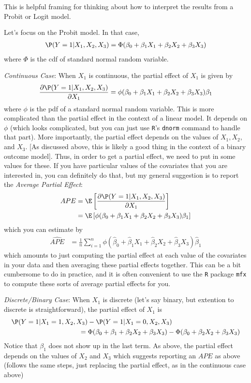 \documentclass[
  letterpaper,
  DIV=11,
  numbers=noendperiod]{scrreprt}
\begin{document}
This is helpful framing for thinking about how to interpret the results
from a Probit or Logit model.

Let's focus on the Probit model. In that case, \begin{align*}
  \P(Y=1|X_1,X_2,X_3) = \Phi(\beta_0 + \beta_1 X_1 + \beta_2 X_2 + \beta_3 X_3)
\end{align*} where \(\Phi\) is the cdf of standard normal random
variable.

\emph{Continuous Case}: When \(X_1\) is continuous, the partial effect
of \(X_1\) is given by \begin{align*}
  \frac{\partial \P(Y=1|X_1,X_2,X_3)}{\partial X_1} = \phi(\beta_0 + \beta_1 X_1 + \beta_2 X_2 + \beta_3 X_3) \beta_1
\end{align*} where \(\phi\) is the pdf of a standard normal random
variable. This is more complicated than the partial effect in the
context of a linear model. It depends on \(\phi\) (which looks
complicated, but you can just use \texttt{R}'s \texttt{dnorm} command to
handle that part). More importantly, the partial effect depends on the
values of \(X_1,X_2,\) and \(X_3\). {[}As discussed above, this is
likely a good thing in the context of a binary outcome model{]}. Thus,
in order to get a partial effect, we need to put in some values for
these. If you have particular values of the covariates that you are
interested in, you can definitely do that, but my general suggestion is
to report the \emph{Average Partial Effect}: \begin{align*}
  APE &= \E\left[ \frac{\partial \P(Y=1|X_1,X_2,X_3)}{\partial X_1} \right] \\
  &= \E\left[ \phi(\beta_0 + \beta_1 X_1 + \beta_2 X_2 + \beta_3 X_3) \beta_1 \right]
\end{align*} which you can estimate by \begin{align*}
  \widehat{APE} &= \frac{1}{n} \sum_{i=1}^n \phi(\hat{\beta}_0 + \hat{\beta}_1 X_1 + \hat{\beta}_2 X_2 + \hat{\beta}_3 X_3) \hat{\beta}_1
\end{align*} which amounts to just computing the partial effect at each
value of the covariates in your data and then averaging these partial
effects together. This can be a bit cumbersome to do in practice, and it
is often convenient to use the \texttt{R} package \texttt{mfx} to
compute these sorts of average partial effects for you.

\emph{Discrete/Binary Case}: When \(X_1\) is discrete (let's say binary,
but extention to discrete is straightforward), the partial effect of
\(X_1\) is \begin{align*}
  & \P(Y=1|X_1=1, X_2, X_3) - \P(Y=1|X_1=0, X_2, X_3) \\
  &\hspace{100pt} = \Phi(\beta_0 + \beta_1 + \beta_2 X_2 + \beta_3 X_3) - \Phi(\beta_0 + \beta_2 X_2 + \beta_3 X_3)
\end{align*} Notice that \(\beta_1\) does not show up in the last term.
As above, the partial effect depends on the values of \(X_2\) and
\(X_3\) which suggests reporting an \(APE\) as above (follows the same
steps, just replacing the partial effect, as in the continuous case
above)
\end{document}

